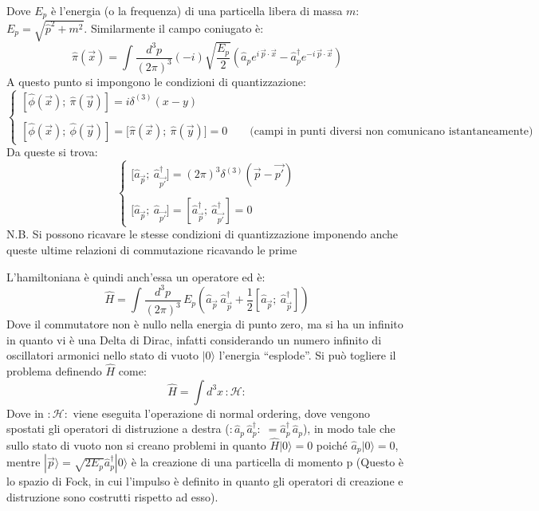 \documentclass[]{article}
\newcommand{\Ham}{\mathcal{H}}
\newcommand{\normord}[1]{:\! #1 \!:}
\begin{document}
Dove $E_p$ è l'energia (o la frequenza) di una particella libera di massa $m$: $E_p = \sqrt{\hat{p}^2 + m^2}$. Similarmente il campo coniugato è:
\begin{equation}
  \hat{\pi}(\vec{x}) = \int \frac{d^3 p}{(2 \pi)^3} (-i) \sqrt{\frac{E_p}{2}} \left( \hat{a}_p e^{ i\, \vec p \cdot \vec x} - \hat{a}^\dagger_p e ^ {-i \, \vec p \cdot \vec x} \right)
\end{equation}
A questo punto si impongono le condizioni di quantizzazione:
\begin{equation}
\begin{cases}

   \left[ \hat{\phi}(\vec x) ; \: \hat{\pi} (\vec y) \right] = i \delta^{(3)} (x - y ) \\
   \\
   \left[ \hat{\phi}(\vec x) ; \: \hat{\phi} (\vec y) \right] = \Big[ \hat{\pi}(\vec x) ; \: \hat{\pi} (\vec y) \Big] = 0 \qquad \text{(campi in punti diversi non comunicano istantaneamente)}
\end{cases}
\end{equation}
Da queste si trova:
\begin{equation}
\begin{cases}

   \Big[ \hat{a}_{\vec p} ; \: \hat{a}_{\vec {p\prime}} ^ \dagger \Big] = (2\pi)^ 3 \delta^{(3)} (\vec p - \vec{p \prime} ) \\
   \\
   \Big[ \hat{a}_{\vec p} ; \: \hat{a}_{\vec {p\prime}} \Big] =  \left[ \hat{a}_{\vec p}^\dagger ; \: \hat{a}_{\vec {p\prime}} ^ \dagger \right] = 0
\end{cases}
\end{equation}
N.B. Si possono ricavare le stesse condizioni di quantizzazione imponendo anche queste ultime relazioni di commutazione ricavando le prime

L'hamiltoniana è quindi anch'essa un operatore ed è:
\begin{equation}
 \hat{H} = \int \frac{d^3 p}{(2\pi)^3} \, E_p \left( \hat{a}_{\vec{p}} \: \hat{a}_{\vec{p}}^\dagger +\frac{1}{2} \left[ \hat{a}_{\vec{p}}; \: \hat{a}_{\vec{p}}^\dagger \right]\right)
\end{equation}
Dove il commutatore non è nullo nella energia di punto zero, ma si ha un infinito in quanto vi è una Delta di Dirac, infatti considerando un numero infinito di oscillatori armonici nello stato di vuoto $| 0 \rangle $ l'energia ``esplode''. Si può togliere  il problema definendo $\hat{H}$ come:
\begin{equation}
 \hat{H} = \int d^3 x \, \normord{\Ham}
\end{equation}
Dove in $\normord{\Ham}$ viene eseguita l'operazione di normal ordering, dove vengono spostati gli operatori di distruzione a destra ($\normord{\hat{a}_p \, \hat{a}_p^\dagger} \; =  \hat{a}_p^\dagger  \, \hat{a}_p $), in modo tale che sullo stato di vuoto non si creano problemi in quanto $ \hat H |0\rangle = 0$ poiché $\hat a_p | 0 \rangle = 0$, mentre $|\vec p \rangle = \sqrt{2 E_p} \hat a ^ \dagger_p |0\rangle$ è la creazione di una particella di momento p (Questo è lo spazio di Fock, in cui l'impulso è definito in quanto gli operatori di creazione e distruzione sono costrutti rispetto ad esso).
\end{document}
